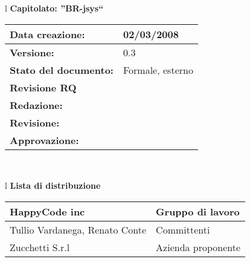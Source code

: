 

\newcommand{\lv}{ 0.3 } %
\newcommand{\dt}{ Test Report }%


\begin{center}
\thispagestyle{plain}
\begin{table}[htbp]
\large{
\begin{tabular}{l}
\Large{\textbf{\textsf{Capitolato: ''BR-jsys``}}} \\
\begin{tabular}{|p{6cm}|p{6cm}|}
\hline
\textbf{Data creazione:} & 02/03/2008 \\ \hline
\textbf{Versione:} & \lv \\ \hline
\textbf{Stato del documento:} & Formale, esterno \\ \hline
\textbf{Revisione RQ} & \\ \hline
\textbf{Redazione:} & \MT \\ \hline
\textbf{Revisione:} &  \\ \hline
\textbf{Approvazione:}  &  \\ \hline
\end{tabular} \\
\end{tabular}
}
\end{table}

\begin{table}[hbtp]
\large{
\begin{tabular}{l}
\Large{\textbf{\textsf{Lista di distribuzione}}} \\
\begin{tabular}{|p{6cm}|p{6cm}|} \hline
{HappyCode inc}& Gruppo di lavoro \\ \hline
{Tullio Vardanega, Renato Conte}& Committenti \\ \hline 
{Zucchetti S.r.l}& Azienda proponente\\ \hline
\end{tabular} \\
\end{tabular}
}
\end{table}
\begin{table}[hbtp]


\end{table}
\end{center}
